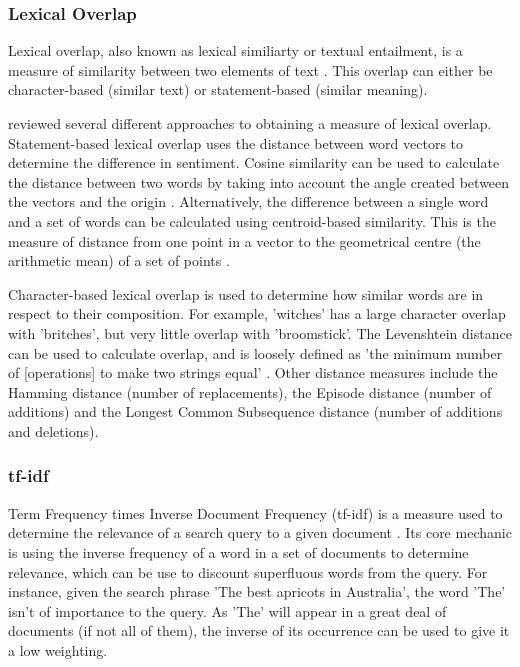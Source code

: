 \subsubsection{Lexical Overlap}
Lexical overlap, also known as lexical similiarty or textual entailment, is a measure of similarity between two elements of text \cite{adams2006}. This overlap can either be character-based (similar text) or statement-based (similar meaning).

 reviewed several different approaches to obtaining a measure of lexical overlap. Statement-based lexical overlap uses the distance between word vectors to determine the difference in sentiment. Cosine similarity can be used to calculate the distance between two words by taking into account the angle created between the vectors and the origin \cite{qian2004}. Alternatively, the difference between a single word and a set of words can be calculated using centroid-based similarity. This is the measure of distance from one point in a vector to the geometrical centre (the arithmetic mean) of a set of points \cite{Awrejcewicz2012}.  

Character-based lexical overlap is used to determine how similar words are in respect to their composition. For example, 'witches' has a large character overlap with 'britches', but very little overlap with 'broomstick'. The Levenshtein distance can be used to calculate overlap, and is loosely defined as 'the minimum number of [operations] to make two strings equal' \cite{navarro2001guided}. Other distance measures include the Hamming distance (number of replacements), the Episode distance (number of additions) and the Longest Common Subsequence distance (number of additions and deletions). 



\subsubsection{tf-idf}\label{lit:tfidf}
Term Frequency times Inverse Document Frequency (tf-idf) is a measure used to determine the relevance of a search query to a given document \cite{Rajaraman2011}. Its core mechanic is using the inverse frequency of a word in a set of documents to determine relevance, which can be use to discount superfluous words from the query. For instance, given the search phrase 'The best apricots in Australia', the word 'The' isn't of importance to the query. As 'The' will appear in a great deal of documents (if not all of them), the inverse of its occurrence can be used to give it a low weighting. 

